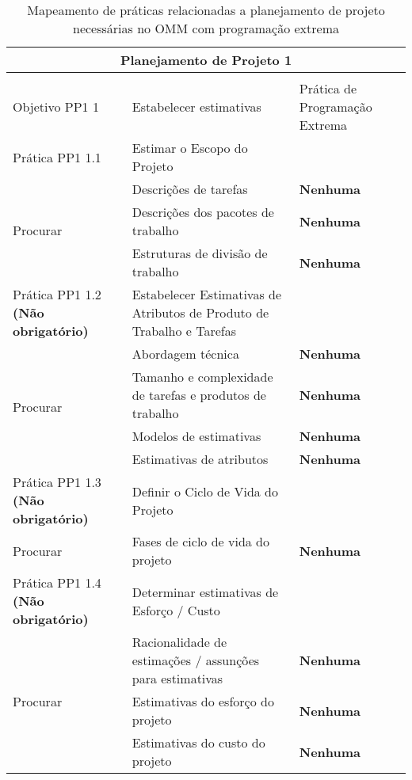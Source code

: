 \begin{longtable}{|p{2cm}|p{7cm}|p{7cm}|}
  \caption{Mapeamento de práticas relacionadas a planejamento de
    projeto necessárias no OMM com programação extrema} \\
  \multicolumn{3}{|c|}{\cellcolor[gray]{0.6} Planejamento de Projeto 1}\\
  \endhead
  & & \\
  \hline \cellcolor[gray]{0.6} Objetivo PP1 1 & \cellcolor[gray]{0.6}
  Estabelecer estimativas &
  Prática de Programação Extrema \\
  \hline \cellcolor[gray]{0.9} Prática PP1 1.1 & \cellcolor[gray]{0.9}
  Estimar o Escopo do Projeto &
  \\
  \hline \multirow{3}{*}{Procurar} & Descrições de tarefas  &\textbf{Nenhuma} \\
  \cline{2-3} & Descrições dos pacotes de trabalho &\textbf{Nenhuma} \\
  \cline{2-3} & Estruturas de divisão de trabalho &\textbf{Nenhuma} \\
  \hline \cellcolor[gray]{0.9} Prática PP1 1.2 \textbf{(Não
    obrigatório)} & \cellcolor[gray]{0.9} Estabelecer Estimativas de
  Atributos de Produto de Trabalho e Tarefas & \\
  \hline \multirow{4}{*}{Procurar} & Abordagem técnica &\textbf{Nenhuma} \\
  \cline{2-3} & Tamanho e complexidade de tarefas e produtos de
  trabalho
  &\textbf{Nenhuma} \\
  \cline{2-3} & Modelos de estimativas &\textbf{Nenhuma} \\
  \cline{2-3} & Estimativas de atributos &\textbf{Nenhuma} \\
  \hline \cellcolor[gray]{0.9} Prática PP1 1.3 \textbf{(Não
    obrigatório)} & \cellcolor[gray]{0.9}
  Definir o Ciclo de Vida do Projeto & \\
  \hline \multirow{1}{*}{Procurar} & Fases de ciclo de vida do projeto &\textbf{Nenhuma} \\
  \hline \cellcolor[gray]{0.9} Prática PP1 1.4 \textbf{(Não
    obrigatório)} & \cellcolor[gray]{0.9}
  Determinar estimativas de Esforço / Custo & \\
  \hline \multirow{3}{*}{Procurar} & Racionalidade de estimações /
  assunções para estimativas &\textbf{Nenhuma} \\
  \cline{2-3} & Estimativas do esforço do projeto &\textbf{Nenhuma} \\
  \cline{2-3} & Estimativas do custo do projeto &\textbf{Nenhuma} \\

\end{longtable}

